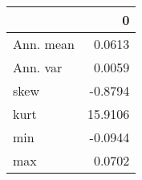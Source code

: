 \begin{tabular}{lr}
\toprule
{} &        0 \\
\midrule
Ann. mean &   0.0613 \\
Ann. var  &   0.0059 \\
skew      &  -0.8794 \\
kurt      &  15.9106 \\
min       &  -0.0944 \\
max       &   0.0702 \\
\bottomrule
\end{tabular}
